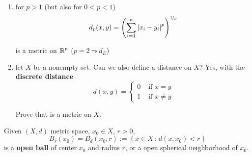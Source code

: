 \begin{enumerate}
    \item for $p>1$ (but also for $0<p<1$)
    \begin{equation*}
        d_p(x,y)=\left(\sum^{n}_{i=1} \left\lvert x_i-y_i \right\rvert^p  \right)^{\nicefrac{1}{p}}
    \end{equation*}

    is a metric on $\mathbb{R}^n$ ($p=2\leadsto d_E$)

    \item let $X$ be a nonempty set. Can we also define a distance on $X$? Yes, with the \textbf{discrete distance}
    \begin{equation*}
        d(x,y)=\begin{cases}
            0 &\text{ if }x=y\\
            1 &\text{ if }x\neq y            
        \end{cases}
    \end{equation*}

    \begin{home}
    Prove that is a metric on $X$.
    \newline
    \newline
    \newline
    \end{home}
\end{enumerate}

\newpage

\begin{defn}
Given $(X,d)$ metric space, $x_0\in X$, $r>0$,
\begin{equation*}
    B_r(x_0)=B_d(x_0,r):=\left\{ x\in X\,:\,d(x,x_0)<r \right\}
\end{equation*}
is a \textbf{open ball} of center $x_0$ and radius $r$, or a open spherical neighborhood of $x_0$.
\end{defn}

